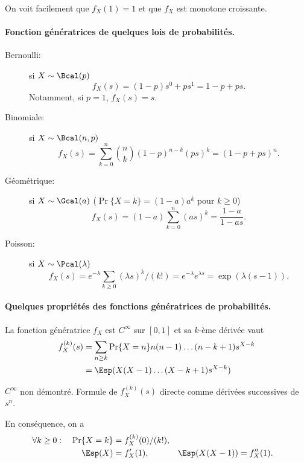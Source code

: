 \remark
On voit facilement que $f_X(1) = 1$ et que $f_X$ est monotone croissante.

\paragraph*{Fonction génératrices de quelques lois de probabilités.}
\begin{description}
  \item[Bernoulli:] si $X \sim \Bcal(p)$ 
  $$
  f_X(s) = (1-p) s^0 + p s^1 = 1 - p + p s.
  $$
  Notamment, si $p = 1$, $f_X(s) = s$.
  \item[Binomiale:] si $X \sim \Bcal(n, p)$
  $$
  f_X(s) = \sum_{k=0}^n {{n}\choose{k}} (1-p)^{n-k} (ps)^k = (1 - p + ps)^n.
  $$
  \item[Géométrique:] si $X \sim \Gcal(a)$ ($\Pr\{X = k\} = (1-a) a^k$ pour $k \geq 0$)
  $$
  f_X(s) = (1-a) \sum_{k=0}^n (as)^k = \frac{1-a}{1 - as}.
  $$
  \item[Poisson:] si $X \sim \Pcal(\lambda)$
  $$
  f_X(s) = e^{-\lambda} \sum_{k\geq0} (\lambda s)^k / (k!) = e^{-\lambda} e^{\lambda s} = \exp(\lambda(s-1)).
  $$
\end{description}

\paragraph*{Quelques propriétés des fonctions génératrices de probabilités.}

\begin{proposition}
  La fonction génératrice $f_X$ est $C^\infty$ sur $[0, 1]$ et sa $k$-ème dérivée vaut
  \begin{align*}
    f_X^{(k)}(s) 
    & = \sum_{n \geq k} \Pr\{X = n\} n(n-1)  \dots (n-k+1) s^{X-k} \\
    & = \Esp(X (X-1) \dots (X-k+1) s^{X-k})
  \end{align*}
\end{proposition}

\proof
  $C^\infty$ non démontré. Formule de $f_X^{(k)}(s)$ directe comme dérivées successives de $s^n$.
\eproof

\begin{corollary}
  En conséquence, on a
  \begin{align*}
    \forall k \geq 0: \quad \Pr\{X = k\} & = f_X^{(k)}(0) / (k!), \\
    \Esp(X) & = f'_X(1), &
    \Esp(X(X-1)) & = f''_X(1).
  \end{align*}
\end{corollary}


